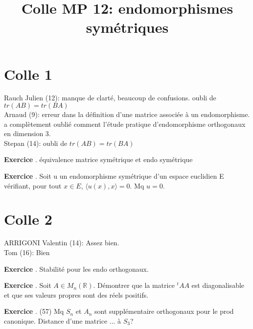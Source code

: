\documentclass[10pt,a4paper]{article}
\title{Colle MP 12: endomorphismes symétriques}
\newcounter{question}
\newcounter{exo}
\newenvironment{exo}{\vspace{0.5cm}\setcounter{question}{0}\addtocounter{exo}{1} \noindent \textbf{Exercice \theexo}. \normalsize }{\par}
\begin{document}
	\maketitle
	
	\section*{Colle 1}
	Rauch Julien (12): manque de clarté, beaucoup de confusions. oubli de $tr(AB) = tr(BA)$\\
	Arnaud (9): erreur dans la définition d'une matrice associée à un endomorphisme. a complètement oublié comment l'étude pratique d'endomorphisme orthogonaux en dimension 3.\\
	Stepan (14): oubli de $tr(AB) = tr(BA)$\\
	
	\begin{exo}
		équivalence matrice symétrique et endo symétrique
	\end{exo}

	\begin{exo}
		Soit u un endomorphisme symétrique d'un espace euclidien E vérifiant, pour tout $x\in E$, $⟨u(x),x⟩=0$. Mq $u = 0$.		
	\end{exo}

		
	\section*{Colle 2}
	\setcounter{exo}{0}
	ARRIGONI Valentin (14): Assez bien.\\
	Tom (16): Bien\\
	
	\begin{exo}
		Stabilité pour les endo orthogonaux.
	\end{exo}

	\begin{exo}
		Soit $A \in M_n(\mathbb{R})$. Démontrer que la matrice $^tAA$ est diagonalisable et que ses valeurs propres sont des réels positifs.
	\end{exo}
	
	\begin{exo}
		(57) Mq $S_n$ et $A_n$ sont supplémentaire orthogonaux pour le prod canonique. Distance d'une matrice ... à $S_3$?
	\end{exo}
		
\end{document}
